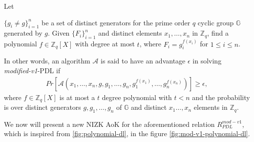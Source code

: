\begin{definition}
  Let\par 
  $\{g_i\neq g\}_{i=1}^n$ be a set of distinct generators for the prime order $q$ cyclic 
  group $\mathbb{G}$ generated by $g$. Given $\{F_i\}_{i=1}^n$ and distinct elements $x_1,\dots,x_n$ in 
  $\mathbb{Z}_q$, find a polynomial $f\in\mathbb{Z}_q[X]$ with degree at most $t$, where 
  $F_i=g_i^{f(x_i)}$ for $1\leq i\leq n$.\par

  In other words, an algorithm $\mathcal{A}$ is said to have an advantage $\epsilon$ in solving \textit{modified-v1}-PDL if 
  \begin{align*}
    Pr[\mathcal{A}(x_1,\dots,x_n,g,g_1,\dots,g_n,g_1^{f(x_1)},\dots,g_n^{f(x_n)})]\geq\epsilon,
  \end{align*}
  where $f\in\mathbb{Z}_q[X]$ is at most a $t$ degree polynomial with $t<n$ and the probability is over 
  distinct generators $g,g_1,\dots,g_n$ of $\mathbb{G}$ and distinct $x_1\dots,x_n$ 
  elements in $\mathbb{Z}_q$.
\end{definition}

We now will present a new NIZK AoK for the aforementioned relation $R_{PDL}^{mod-v1}$, which is inspired from \ref{fig:polynomial-dl}, 
in the figure \ref{fig:mod-v1-polynomial-dl}.

